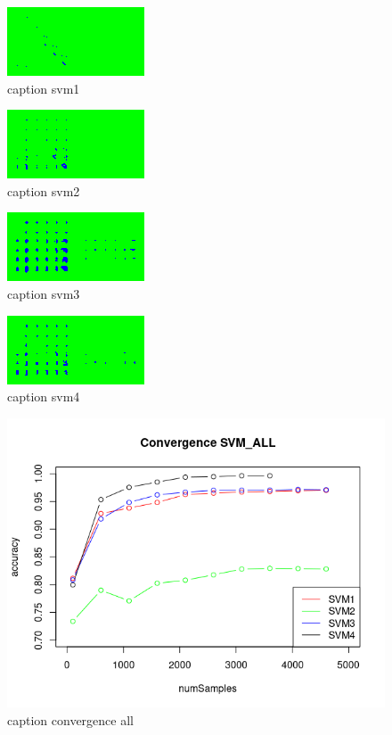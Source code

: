 \documentclass[11pt]{article}
\begin{document}
\begin{figure}[H]
	\centering
	\includegraphics[width=.45\textwidth]{../testdata/svm1.png}
	\caption{caption svm1}
	\label{svm1}
\end{figure}
\begin{figure}[H]
	\centering
	\includegraphics[width=.45\textwidth]{../testdata/svm2.png}
	\caption{caption svm2}
	\label{svm2}
\end{figure}
\begin{figure}[H]
	\centering
	\includegraphics[width=.45\textwidth]{../testdata/svm3.png}
	\caption{caption svm3}
	\label{svm3}
\end{figure}
\begin{figure}[H]
	\centering
	\includegraphics[width=.45\textwidth]{../testdata/svm4.png}
	\caption{caption svm4}
	\label{svm4}
\end{figure}
\begin{figure}[H]
	\centering
	\includegraphics[width=.45\textwidth]{../testdata/convergence_all.png}
	\caption{caption convergence all}
	\label{fig:conv_svmall}
\end{figure}
\end{document}
